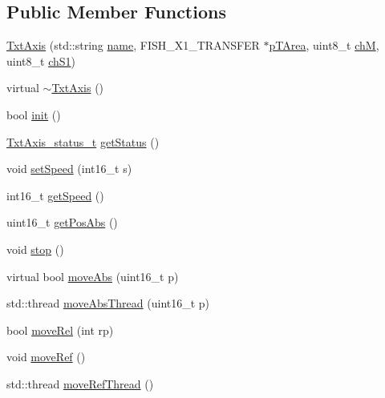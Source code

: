 \subsection*{Public Member Functions}
\begin{DoxyCompactItemize}
\item 
\hyperlink{classft_1_1_txt_axis_ab381c0ebcd4cae9df6d98287bacfd07f}{Txt\+Axis} (std\+::string \hyperlink{classft_1_1_txt_axis_a358af2b2ed1709b40ab6c9768c2795ef}{name}, F\+I\+S\+H\+\_\+\+X1\+\_\+\+T\+R\+A\+N\+S\+F\+ER $\ast$\hyperlink{classft_1_1_txt_axis_ae5521c2eda7b80599ed6340f6a8192f2}{p\+T\+Area}, uint8\+\_\+t \hyperlink{classft_1_1_txt_axis_a3a8988acb2f578fe96312221205c50c4}{chM}, uint8\+\_\+t \hyperlink{classft_1_1_txt_axis_a9b155580a8dcc876c8e0c4b9c92041e7}{ch\+S1})
\item 
virtual \hyperlink{classft_1_1_txt_axis_a7870184dba5c3e52edab4b69aa21d0cf}{$\sim$\+Txt\+Axis} ()
\item 
bool \hyperlink{classft_1_1_txt_axis_abec2d76398791fe4580fb38e0a25abe3}{init} ()
\item 
\hyperlink{namespaceft_a05630ec9d5a49c43a00ca107cfe6b350}{Txt\+Axis\+\_\+status\+\_\+t} \hyperlink{classft_1_1_txt_axis_acc8c2c6a1364a46c3147ea4d6b37a97c}{get\+Status} ()
\item 
void \hyperlink{classft_1_1_txt_axis_ad35a7e103aa3054302dd89c892c754b4}{set\+Speed} (int16\+\_\+t s)
\item 
int16\+\_\+t \hyperlink{classft_1_1_txt_axis_a83dd19fa863d5cf0d374f3bb0ab6c2af}{get\+Speed} ()
\item 
uint16\+\_\+t \hyperlink{classft_1_1_txt_axis_a1379066c1b28588283e2dc9f1e7aea11}{get\+Pos\+Abs} ()
\item 
void \hyperlink{classft_1_1_txt_axis_ab67bcbd24996bb94f9daedadd304e8d6}{stop} ()
\item 
virtual bool \hyperlink{classft_1_1_txt_axis_a0ae92e37ed640f5d65e59cd1ae6fe9cf}{move\+Abs} (uint16\+\_\+t p)
\item 
std\+::thread \hyperlink{classft_1_1_txt_axis_a319c02fb4ac1e1e3d86d8c126d5aee04}{move\+Abs\+Thread} (uint16\+\_\+t p)
\item 
bool \hyperlink{classft_1_1_txt_axis_a7b6f1cf66ca1e0668a5c689c0c8f6531}{move\+Rel} (int rp)
\item 
void \hyperlink{classft_1_1_txt_axis_ae8b0cb457a477a20ff932efeddbcd991}{move\+Ref} ()
\item 
std\+::thread \hyperlink{classft_1_1_txt_axis_a6a40c2cb6993b94a3c47aab8181545fa}{move\+Ref\+Thread} ()
\end{DoxyCompactItemize}
